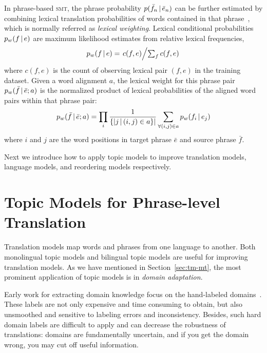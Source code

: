 In phrase-based \textsc{smt}, the phrase probability $p(\bar{f}_n \, | \,
\bar{e}_n)$ can be further estimated by combining lexical translation
probabilities of words contained in that phrase~\citep{koehn-03},
which is normally referred as \textit{lexical weighting}. Lexical
conditional probabilities $p_w(f \, | \, e)$ are maximum likelihood estimates
from relative lexical frequencies,
\begin{equation}
\label{eq:lexical_prob}
p_w(f \, | \, e) = \textstyle \left.c(f, e)\middle/\sum_f{c(f, e)}\right.
\end{equation}
where $c(f, e)$ is the count of observing lexical pair $(f, e)$ in the
training dataset. Given a word alignment $a$, the lexical weight for
this phrase pair $p_w(\bar{f} \, | \, \bar{e}; a)$ is the normalized product
of lexical probabilities of the aligned word pairs within that phrase
pair:
\begin{equation}
\label{eq:phrase_prob}
p_w(\bar{f} \, | \, \bar{e}; a) = \prod_{i} \frac{1}{\{|j \, | \, (i, j) \in a\}|} \sum_{\forall (i,j) \in a} p_w(f_i \, | \, e_j)
\end{equation}
where $i$ and $j$ are the word positions in target phrase $\bar{e}$
and source phrase $\bar{f}$.

Next we introduce how to apply topic models to improve translation
models, language models, and reordering models respectively.


\section{Topic Models for Phrase-level Translation}
\label{sec:trans-multiling}

Translation models map words and phrases from one language to another.
Both monolingual topic models and bilingual topic models are useful for improving translation models.
As we have mentioned in Section~\ref{sec:tm-mt}, 
the most prominent application of topic models is in {\em domain adaptation}.

Early work for extracting domain knowledge focus on the hand-labeled domains~\citep{foster-07,matsoukas-09,chiang-11}.
These labels are not only expensive and time consuming to obtain, but also unsmoothed and sensitive 
to labeling errors and inconsistency. Besides, such hard domain labels are difficult to 
apply and can decrease the robustness of translations: domains are fundamentally uncertain, 
and if you get the domain wrong, you may cut off useful information.

